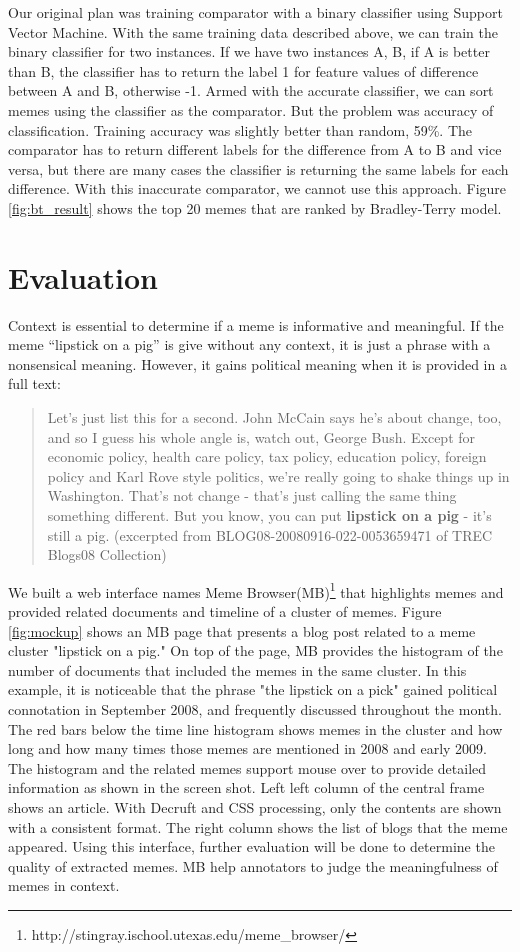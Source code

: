 \documentclass{sig-alternate}
\begin{document}
Our original plan was training comparator with a binary classifier using Support Vector Machine. With the same training data described above, we can train the binary classifier for two instances. If we have two instances A, B, if A is better than B, the classifier has to return the label 1 for feature values of difference between A and B, otherwise -1. Armed with the accurate classifier, we can sort memes using the classifier as the comparator. But the problem was accuracy of classification. Training accuracy was slightly better than random, 59\%. The comparator has to return different labels for the difference from A to B and vice versa, but there are many cases the classifier is returning the same labels for each difference. With this inaccurate comparator, we cannot use this approach. Figure \ref{fig:bt_result} shows the top 20 memes that are ranked by Bradley-Terry model.

\section{Evaluation}

Context is essential to determine if a meme is informative and meaningful. If the meme ``lipstick on a pig'' is give without any context, it is just a phrase with a nonsensical meaning. However, it gains political meaning when it is provided in a full text: 
\begin{quote}
Let's just list this for a second. John McCain says he's about change, too, and so I guess his whole angle is, watch out, George Bush. Except for economic policy, health care policy, tax policy, education policy, foreign policy and Karl Rove style politics, we're really going to shake things up in Washington. That's not change - that's just calling the same thing something different. But you know, you can put \textbf{lipstick on a pig} - it's still a pig. (excerpted from BLOG08-20080916-022-0053659471 of TREC Blogs08 Collection)
\end{quote}

We built a web interface names Meme Browser(MB)\footnote{http://stingray.ischool.utexas.edu/meme\_browser/} that highlights memes and provided related documents and timeline of a cluster of memes. Figure \ref{fig:mockup} shows an MB page that presents a blog post related to a meme cluster "lipstick on a pig." On top of the page, MB provides the histogram of the number of documents that included the memes in the same cluster. In this example, it is noticeable that the phrase "the lipstick on a pick" gained political connotation in September 2008, and frequently discussed throughout the month. The red bars below the time line histogram shows memes in the cluster and how long  and how many times those memes are mentioned in 2008 and early 2009. The histogram and the related memes support mouse over to provide detailed information as shown in the screen shot. Left left column of the central frame shows an article. With Decruft and CSS processing, only the contents are shown with a consistent format. The right column shows the list of blogs that the meme appeared. Using this interface, further evaluation will be done to determine the quality of extracted memes. MB help annotators to judge the meaningfulness of memes in context.
\end{document}
